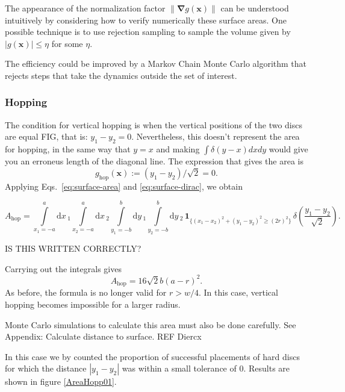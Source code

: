 \documentclass[superscriptaddress,pre,reprint,showpacs,onecolumn]{revtex4-1}
\newcommand{\rd}[1]{\mathrm{d}{#1} \,}
\newcommand{\indicatorsymbol}{\mathbf{1}}
\newcommand{\indicator}[1]{\indicatorsymbol_{ \{   #1 \} } }
\begin{document}
The appearance of the normalization factor $\| \mathbf{\nabla}g(\mathbf{x}) \|$ can be understood intuitively by considering how to verify numerically these surface areas. One possible technique is to use rejection sampling to sample the volume given by $|g(\mathbf{x})| \le \eta$ for some $\eta$.

The efficiency could be improved by a Markov Chain Monte Carlo algorithm that rejects steps that take the dynamics outside the set of interest.

\subsubsection{Hopping}

The condition for vertical hopping is when the vertical positions of the two discs are equal FIG, that is: $y_1-y_2=0$. Nevertheless, this doesn't represent the area for hopping,
in the same way that $y=x$ and making $ \int \delta(y-x) dx dy$  would give you an erroneus length of the diagonal line. The expression that gives the area is
$$g_\text{hop}(\mathbf{x}) := (y_1 - y_2)/\sqrt{2} = 0.$$
Applying Eqs.~\eqref{eq:surface-area} and \eqref{eq:surface-dirac}, we obtain
%
\begin{widetext}
\begin{equation}
 A_\text{hop} = \int\limits_{x_1 = -a}^a \rd x_1 \int\limits_{x_2 = -a}^a \rd x_2 
\int\limits_{y_1 = -b}^b \rd y_1 \int\limits_{y_2 = -b}^b \rd y_2 \, \indicator{ (x_1-x_2)^2 + (y_1-y_2)^2 \ge (2r)^2 } \, \delta(\frac{y_1-y_2}{\sqrt{2}}).
\end{equation}
\end{widetext}
IS THIS WRITTEN CORRECTLY?

Carrying out the integrals gives
 \begin{equation}
 A_\text{hop}  =  16 \sqrt{2} b(a-r)^2.
\end{equation}
As before, the formula is no longer valid for $r > w/4$. In this case,
vertical hopping becomes impossible for a larger radius.

Monte Carlo simulations to calculate this area must also be done carefully.
See Appendix: Calculate distance to surface.
REF Diercx

In this case we 
by counted the proportion of successful placements of hard discs 
for which the distance 
$|y_1 - y_2|$ was within a small tolerance of $0$. 
Results are shown in figure \ref{AreaHopp01}.
\end{document}

